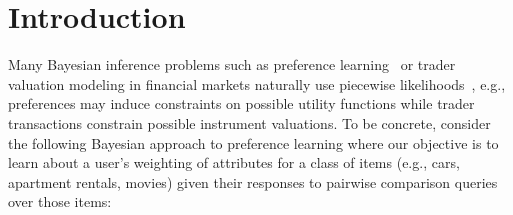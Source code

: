 \section{Introduction}

Many Bayesian inference problems such as preference
learning~\cite{sanner:aistats10} or trader valuation modeling in
financial markets naturally use piecewise
likelihoods~\cite{Shogren:00}, e.g., preferences may induce
constraints on possible utility functions while trader transactions
constrain possible instrument valuations.  To be concrete, consider
the following Bayesian approach to preference learning where our
objective is to learn about a user's weighting of attributes for a
class of items (e.g., cars, apartment rentals, movies) given their
responses to pairwise comparison queries over those items:

